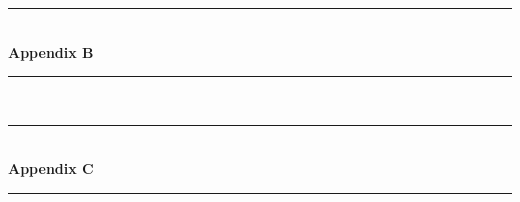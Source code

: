 \documentclass[a4paper]{IEEEtran}
\begin{document}
\clearpage

\begin{titlepage}
    \newcommand{\HRule}{\rule{\linewidth}{0.5mm}} %
    \center %
    \vspace*{3cm}
    \HRule \\[0.4cm]
    { \huge \bfseries Appendix B}\\[0.4cm] %
    \HRule \\[1.5cm]
\end{titlepage}

\clearpage

\begin{titlepage}
    \newcommand{\HRule}{\rule{\linewidth}{0.5mm}} %
    \center %
    \vspace*{3cm}
    \HRule \\[0.4cm]
    { \huge \bfseries Appendix C}\\[0.4cm] %
    \HRule \\[1.5cm]
\end{titlepage}

\end{document}
